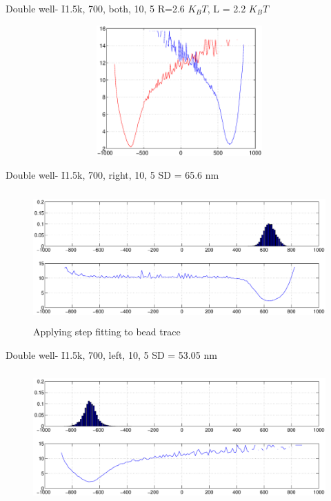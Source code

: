 \documentclass{beamer}
\begin{document}
\begin{frame}{Double well- I1.5k, 700, both, 10, 5} 
R=2.6 $K_BT$, L = 2.2 $K_BT$
\begin{figure}
    \centering
    \includegraphics[height=5cm,width=12cm]{both_wells_1_5k_700_3and9.eps}
    \label{fig:graph8}
\end{figure}


\end{frame}
\begin{frame}{Double well- I1.5k, 700, right, 10, 5} 
SD = 65.6 nm
\begin{figure}
    \centering
    \includegraphics[height=5cm,width=12cm]{right_well_I1_5k_700_4.eps}
    \caption{Applying step fitting to bead trace}
    \label{fig:graph9}
\end{figure}


\end{frame}

\begin{frame}{Double well- I1.5k, 700, left, 10, 5} 
SD = 53.05 nm 
\begin{figure}
    \centering
    \includegraphics[height=5cm,width=12cm]{left_well_I1_5k_700_3.eps}
    \label{fig:graph10}
\end{figure}


\end{frame}
\end{document}
